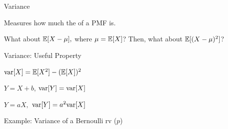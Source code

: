 \documentclass[fleqn,aspectratio=169]{beamer}
\begin{document}
\begin{frame}{Variance}

\plitemsep 0.1in
\bci 

\item<1-> Measures how much the  of a PMF is. 

\item<2-> What about $\mathbb{E}[ X - \mu ],$ where $\mu = \mathbb{E}[ X ]$? Then, what about $\mathbb{E}[ (X - \mu)^2 ]$?


{
}
\eci 

\end{frame}

\begin{frame}{Variance: Useful Property}


{
\plitemsep 0.1in
\small

\bci 

\item  $\text{var}[ X ] = \mathbb{E}[ X^2 ] - (\mathbb{E}[ X ])^2$
\item $Y= X+b$, $\text{var}[ Y ] = \text{var}[ X ]$

\item $Y = aX,$ $\text{var}[ Y ] = a^2\text{var}[ X ]$


\eci 
}
{
Example: Variance of a Bernoulli rv ($p$)

}
\end{frame}
\end{document}
